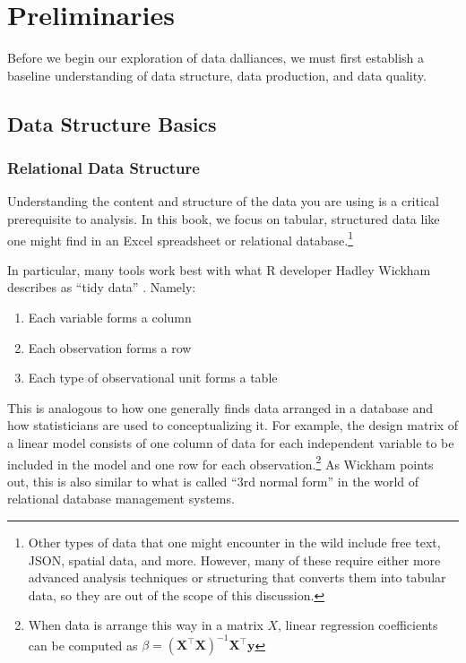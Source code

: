 \documentclass[
]{krantz}
\providecommand{\tightlist}{%
  \setlength{\itemsep}{0pt}\setlength{\parskip}{0pt}}
\begin{document}
\hypertarget{preliminaries}{%
\section{Preliminaries}\label{preliminaries}}

Before we begin our exploration of data dalliances, we must first establish a baseline understanding of data structure, data production, and data quality.

\hypertarget{data-structure-basics}{%
\subsection{Data Structure Basics}\label{data-structure-basics}}

\hypertarget{relational-data-structure}{%
\subsubsection{Relational Data Structure}\label{relational-data-structure}}

Understanding the content and structure of the data you are using is a critical prerequisite to analysis.
In this book, we focus on tabular, structured data like one might find in an Excel spreadsheet or relational database.\footnote{Other types of data that one might encounter in the wild include free text, JSON, spatial data, and more. However, many of these require either more advanced analysis techniques or structuring that converts them into tabular data, so they are out of the scope of this discussion.}

In particular, many tools work best with what R developer Hadley Wickham describes as ``tidy data'' \citep{wickham_tidy}. Namely:

\begin{enumerate}
\def\labelenumi{\arabic{enumi}.}
\tightlist
\item
  Each variable forms a column
\item
  Each observation forms a row
\item
  Each type of observational unit forms a table
\end{enumerate}

This is analogous to how one generally finds data arranged in a database and how statisticians are used to conceptualizing it.
For example, the design matrix of a linear model consists of one column of data for each independent variable to be included in the model and one row for each observation.\footnote{When data is arrange this way in a matrix \(X\), linear regression coefficients can be computed as \(\beta = (\mathbf{X}^\intercal\mathbf{X})^{-1}\mathbf{X}^\intercal \mathbf{y}\)}
As Wickham points out, this is also similar to what is called ``3rd normal form'' in the world of relational database management systems.
\end{document}
